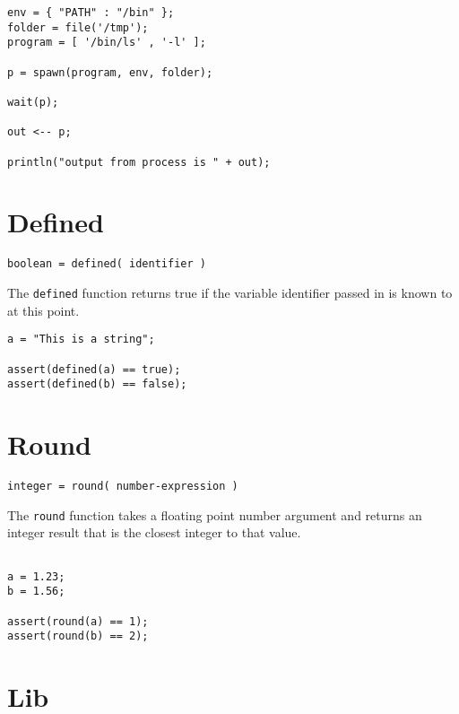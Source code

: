 \begin{lstlisting}[caption={Spawn example}]
env = { "PATH" : "/bin" };
folder = file('/tmp');
program = [ '/bin/ls' , '-l' ];

p = spawn(program, env, folder);

wait(p);

out <-- p;

println("output from process is " + out);
\end{lstlisting}

\section{Defined}

\begin{Verbatim}
boolean = defined( identifier )
\end{Verbatim}

The \Verb+defined+ function returns true if the variable identifier passed in is known to \Reflex at this point.

\begin{lstlisting}[caption={Defined example}]
a = "This is a string";

assert(defined(a) == true);
assert(defined(b) == false);

\end{lstlisting}

\section{Round}

\begin{Verbatim}
integer = round( number-expression )
\end{Verbatim}

The \Verb+round+ function takes a floating point number argument and returns an integer result that is the closest integer to that value.

\begin{lstlisting}[caption={Round example}]

a = 1.23;
b = 1.56;

assert(round(a) == 1);
assert(round(b) == 2);
\end{lstlisting}

\section{Lib}

